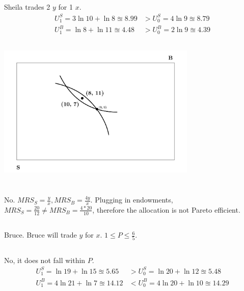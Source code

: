 \documentclass{article}
\begin{document}
	\subsection[e]{}
		Sheila trades 2 $y$ for 1 $x$. 
		\begin{align*}
			U_1^S = 3 \ln 10+ \ln 8 \approxeq 8.99 &> U_0^S = 4 \ln 9 \approxeq 8.79 \\
			U_1^B = \ln 8 + \ln 11 \approxeq 4.48 &> U_0^B = 2\ln 9 \approxeq 4.39
		\end{align*}
	\subsection[f]{}
		\includegraphics[height=2.5in]{Charts/2f}
\section[3]{}
	\subsection[a]{}
		No. $MRS_S = \frac{y}{x}, MRS_B = \frac{4y}{x}.$ Plugging in endowments, $MRS_S = \frac{20}{12} \not = MRS_B = \frac{4*20}{10}$, therefore the allocation is not Pareto efficient. 
	\subsection[b]{}
		Bruce. Bruce will trade $y$ for $x$. $1 \leq P \leq \frac{6}{5}.$
	\subsection[c]{}
		No, it does not fall within $P$.
			\begin{align*}
				U_1^S = \ln 19 + \ln 15 \approxeq 5.65 &> U_0^S = \ln 20 + \ln 12 \approxeq 5.48 \\
				U_1^B = 4 \ln 21 + \ln 7 \approxeq 14.12 &< U_0^B = 4 \ln 20 + \ln 10 \approxeq 14.29
			\end{align*}
\end{document}
